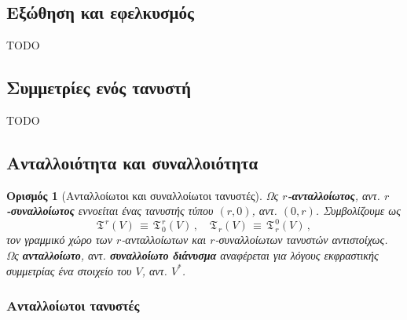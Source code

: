 \documentclass[11pt,a4paper,twoside,openright]{book}
\newtheorem{definition}[lemma]{Ορισμός}
\begin{document}
\subsection{Εξώθηση και εφελκυσμός}
	\label{sec:pullback-and-pushforward}
	
TODO
	
\subsection{Συμμετρίες ενός τανυστή}
	\label{sec:tensor-symmetries}
	
TODO

\subsection{Ανταλλοιότητα και συναλλοιότητα}

\begin{definition}[Ανταλλοίωτοι και συναλλοίωτοι τανυστές]
	\label{def:covariant-contravariant-tensor}
Ως \textbf{$r$-ανταλλοίωτος}, αντ. \textbf{$r$-συναλλοίωτος}
εννοείται ένας τανυστής τύπου $(r, 0)$, αντ. $(0,r)$.
Συμβολίζουμε ως
\begin{equation*}
\mathfrak{T}^{\,r}(V)
\,
\equiv
\,
\mathfrak{T}^{\,r}_{\,0}(V)\,,
\quad
\mathfrak{T}_{\,r}(V)
\,
\equiv
\,
\mathfrak{T}^{\,0}_{\,r}(V)\,,
\end{equation*}
τον γραμμικό χώρο των $r$-ανταλλοίωτων και $r$-συναλλοίωτων τανυστών αντιστοίχως.
Ως \textbf{ανταλλοίωτο}, αντ. \textbf{συναλλοίωτο διάνυσμα} αναφέρεται για λόγους εκφραστικής συμμετρίας ένα στοιχείο του $V$, αντ. $V^*$.
\end{definition}

\subsubsection{Ανταλλοίωτοι τανυστές}
	\label{sec:contravariant-tensors}
\end{document}
